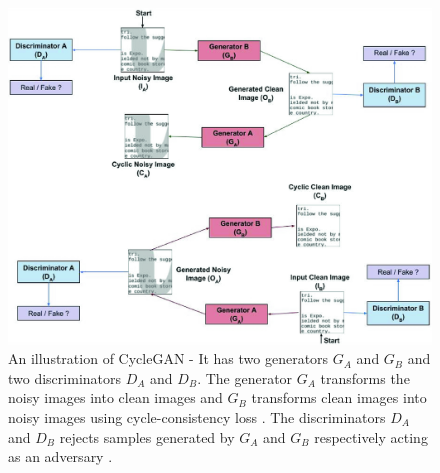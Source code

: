 \begin{figure}[H]
        \begin{center}
 	    \includegraphics[scale=1.20]{images/relatedWorks/LearningToClean.jpg}
	    \caption[An illustration of \ac{CycleGAN} transforming the noisy images into clean images and vice versa.]{An illustration of \ac{CycleGAN} -  It has two generators $G_A$ and $G_B$ and two discriminators $D_A$ and $D_B$. The generator $G_A$ transforms the noisy images into clean images and $G_B$ transforms clean images into noisy images using cycle-consistency loss \cite{zhu2020unpaired}. The discriminators $D_A$ and $D_B$ rejects samples generated by $G_A$ and $G_B$ respectively acting as an adversary \cite{sharma2019learning}.}
	    \label{fig:LearningToClean}
	    \end{center}
\end{figure}



